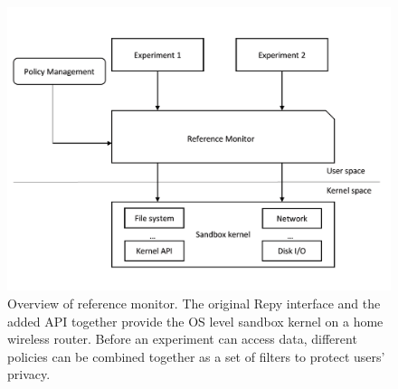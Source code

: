\begin{figure}%
\centering
\includegraphics[width=0.8\columnwidth]{figure/referencemonitor.png}
\caption{Overview of reference monitor. The original Repy interface and the added API together provide the OS level sandbox kernel on a home wireless router. Before an experiment can access data, different policies can be combined together as a set of filters to protect users' privacy.}
\label{fig-reference}
\end{figure}


